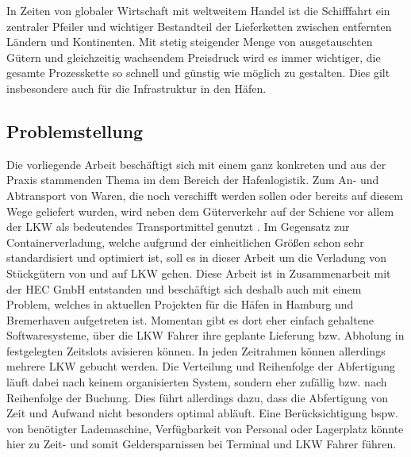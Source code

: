 

In Zeiten von globaler Wirtschaft mit weltweitem Handel ist die Schifffahrt ein zentraler Pfeiler und wichtiger Bestandteil der Lieferketten zwischen entfernten Ländern und Kontinenten. Mit stetig steigender Menge von ausgetauschten Gütern und gleichzeitig wachsendem Preisdruck wird es immer wichtiger, die gesamte Prozesskette so schnell und günstig wie möglich zu gestalten. Dies gilt insbesondere auch für die Infrastruktur in den Häfen. 

\subsection{Problemstellung}

Die vorliegende Arbeit beschäftigt sich mit einem ganz konkreten und aus der Praxis stammenden Thema im dem Bereich der Hafenlogistik. Zum An- und Abtransport von Waren, die noch verschifft werden sollen oder bereits auf diesem Wege geliefert wurden, wird neben dem Güterverkehr auf der Schiene vor allem der LKW als bedeutendes Transportmittel genutzt . Im Gegensatz zur Containerverladung, welche aufgrund der einheitlichen Größen schon sehr standardisiert und optimiert ist, soll es in dieser Arbeit um die Verladung von Stückgütern von und auf LKW gehen. Diese Arbeit ist in Zusammenarbeit mit der HEC GmbH entstanden und beschäftigt sich deshalb auch mit einem Problem, welches in aktuellen Projekten für die Häfen in Hamburg und Bremerhaven aufgetreten ist. Momentan gibt es dort eher einfach gehaltene Softwaresysteme, über die LKW Fahrer ihre geplante Lieferung bzw. Abholung in festgelegten Zeitslots avisieren können. In jeden Zeitrahmen können allerdings mehrere LKW gebucht werden. Die Verteilung und Reihenfolge der Abfertigung läuft dabei nach keinem organisierten System, sondern eher zufällig bzw. nach Reihenfolge der Buchung. Dies führt allerdings dazu, dass die Abfertigung von Zeit und Aufwand nicht besonders optimal abläuft. Eine Berücksichtigung bspw. von benötigter Lademaschine, Verfügbarkeit von Personal oder Lagerplatz könnte hier zu Zeit- und somit Geldersparnissen bei Terminal und LKW Fahrer führen. 

